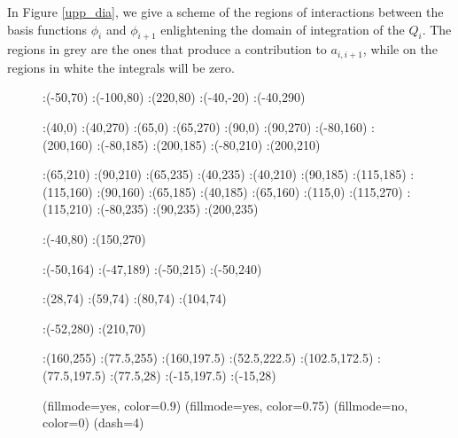 {In Figure \ref{upp_dia}, we give a scheme of the regions of interactions between the basis functions $\phi_i$ and $\phi_{i+1}$ enlightening the domain of integration of the $Q_i$. The regions in grey are the ones that produce a contribution to $a_{i,i+1}$, while on the regions in white the integrals will be zero.
\begin{figure}[h]
\figinit{0.7pt}
:(-50,70)
:(-100,80) :(220,80)
:(-40,-20) :(-40,290)

:(40,0) :(40,270)
:(65,0) :(65,270)
:(90,0) :(90,270)
%
:(-80,160) :(200,160)
:(-80,185) :(200,185)
:(-80,210) :(200,210)
%

:(65,210) :(90,210)
:(65,235) :(40,235) 
:(40,210) :(90,185)
:(115,185) :(115,160)
:(90,160) :(65,185)
:(40,185) :(65,160) 
:(115,0) :(115,270) 
:(115,210) :(-80,235) 
:(90,235) :(200,235) 

:(-40,80) :(150,270)

:(-50,164) :(-47,189) 
:(-50,215) :(-50,240) 

:(28,74) :(59,74) 
:(80,74) :(104,74) 

:(-52,280) :(210,70)

:(160,255) :(77.5,255)
:(160,197.5) :(52.5,222.5)
:(102.5,172.5) :(77.5,197.5)
:(77.5,28) :(-15,197.5)
:(-15,28) 


\figdrawbegin{}

\figset(fillmode=yes, color=0.9)
\figdrawline[29,30,10,8,29]
\figdrawline[29,31,32,33,29]
\figdrawline[30,34,14,16,30]
\figdrawline[35,36,37,34,35]
\figdrawline[34,38,7,9,34]
\figdrawline[38,29,15,13,38]
\figset(fillmode=yes, color=0.75)
\figdrawline[29,30,34,38,29]
\figset(fillmode=no, color=0)
\figdrawarrow[1,2]
\figdrawarrow[3,4]
\figdrawline[8,31]
\figdrawline[10,30]
\figdrawline[30,16]
\figdrawline[35,14]
\figdrawline[35,36]
\figdrawline[36,37]
\figdrawline[37,9]
\figdrawline[38,7]
\figdrawline[38,13]
\figdrawline[33,15]
\figdrawline[32,33]
\figdrawline[32,31]
\figset(dash=4)
\figdrawline[6,32]
\figdrawline[39,5]
\figdrawline[40,11]
\figdrawline[36,12]
\figdrawline[36,41]
\figdrawline[42,43]
\figdrawline[32,44]
\figdrawline[45,46]


\end{figure}}
